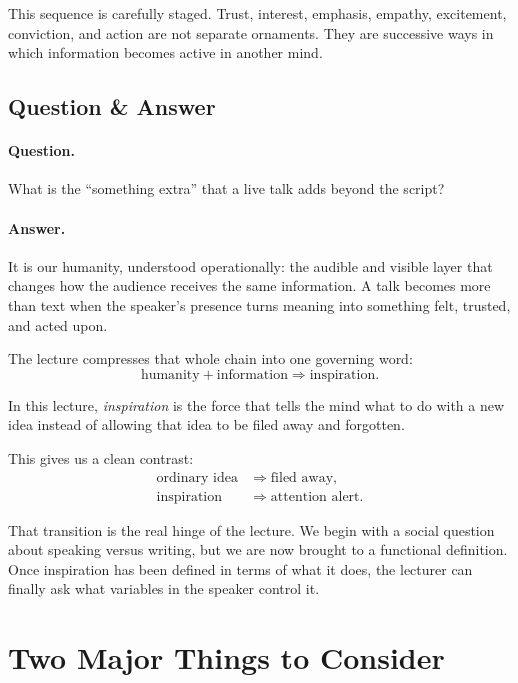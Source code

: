 This sequence is carefully staged. Trust, interest, emphasis, empathy, excitement, conviction, and action are not separate ornaments. They are successive ways in which information becomes active in another mind.

\subsection{Question \& Answer}

\paragraph{Question.} What is the ``something extra'' that a live talk adds beyond the script?

\paragraph{Answer.} It is our humanity, understood operationally: the audible and visible layer that changes how the audience receives the same information. A talk becomes more than text when the speaker's presence turns meaning into something felt, trusted, and acted upon.

The lecture compresses that whole chain into one governing word:
\begin{equation}
\text{humanity} + \text{information} \Longrightarrow \text{inspiration}.
\end{equation}

\begin{definition}
In this lecture, \emph{inspiration} is the force that tells the mind what to do with a new idea instead of allowing that idea to be filed away and forgotten.
\end{definition}

This gives us a clean contrast:
\begin{align}
\text{ordinary idea} &\Longrightarrow \text{filed away}, \\
\text{inspiration} &\Longrightarrow \text{attention alert}.
\end{align}

That transition is the real hinge of the lecture. We begin with a social question about speaking versus writing, but we are now brought to a functional definition. Once inspiration has been defined in terms of what it does, the lecturer can finally ask what variables in the speaker control it.

\section{Two Major Things to Consider}

